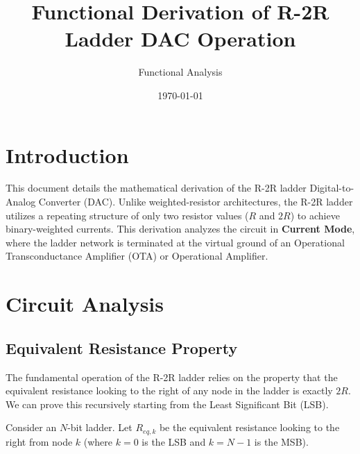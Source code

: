 \documentclass[11pt, a4paper]{article}
\title{Functional Derivation of R-2R Ladder DAC Operation}
\author{Functional Analysis}
\date{\today}
\begin{document}
\maketitle

\section{Introduction}
This document details the mathematical derivation of the R-2R ladder Digital-to-Analog Converter (DAC). Unlike weighted-resistor architectures, the R-2R ladder utilizes a repeating structure of only two resistor values ($R$ and $2R$) to achieve binary-weighted currents. This derivation analyzes the circuit in \textbf{Current Mode}, where the ladder network is terminated at the virtual ground of an Operational Transconductance Amplifier (OTA) or Operational Amplifier.

\section{Circuit Analysis}

\subsection{Equivalent Resistance Property}
The fundamental operation of the R-2R ladder relies on the property that the equivalent resistance looking to the right of any node in the ladder is exactly $2R$. We can prove this recursively starting from the Least Significant Bit (LSB).

Consider an $N$-bit ladder. Let $R_{eq, k}$ be the equivalent resistance looking to the right from node $k$ (where $k=0$ is the LSB and $k=N-1$ is the MSB).
\end{document}
